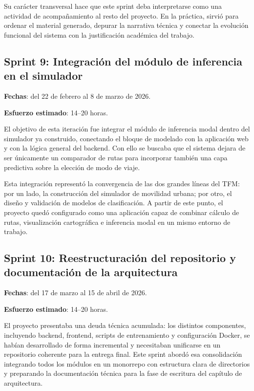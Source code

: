 Su carácter transversal hace que este sprint deba interpretarse como una actividad de acompañamiento al resto del proyecto. En la práctica, sirvió para ordenar el material generado, depurar la narrativa técnica y conectar la evolución funcional del sistema con la justificación académica del trabajo.

\subsection{Sprint 9: Integración del módulo de inferencia en el simulador}

\textbf{Fechas}: del 22 de febrero al 8 de marzo de 2026.

\textbf{Esfuerzo estimado}: 14--20 horas.

El objetivo de esta iteración fue integrar el módulo de inferencia modal dentro del simulador ya construido, conectando el bloque de modelado con la aplicación web y con la lógica general del backend. Con ello se buscaba que el sistema dejara de ser únicamente un comparador de rutas para incorporar también una capa predictiva sobre la elección de modo de viaje.

Esta integración representó la convergencia de las dos grandes líneas del TFM: por un lado, la construcción del simulador de movilidad urbana; por otro, el diseño y validación de modelos de clasificación. A partir de este punto, el proyecto quedó configurado como una aplicación capaz de combinar cálculo de rutas, visualización cartográfica e inferencia modal en un mismo entorno de trabajo.

\subsection{Sprint 10: Reestructuración del repositorio y documentación de la arquitectura}

\textbf{Fechas}: del 17 de marzo al 15 de abril de 2026.

\textbf{Esfuerzo estimado}: 14--20 horas.

El proyecto presentaba una deuda técnica acumulada: los distintos componentes, incluyendo backend, frontend, scripts de entrenamiento y configuración Docker, se habían desarrollado de forma incremental y necesitaban unificarse en un repositorio coherente para la entrega final. Este sprint abordó esa consolidación integrando todos los módulos en un monorrepo con estructura clara de directorios y preparando la documentación técnica para la fase de escritura del capítulo de arquitectura.


